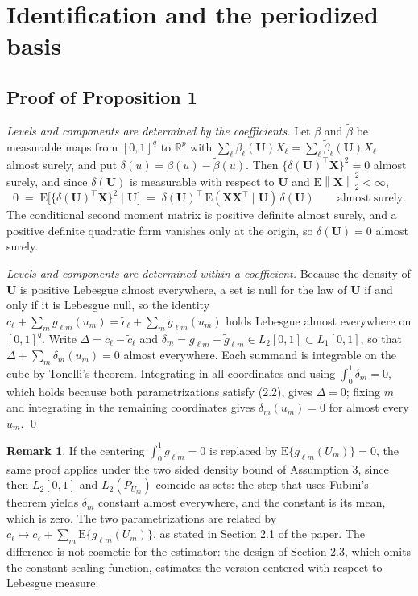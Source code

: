 \documentclass[10pt]{book}
\theoremstyle{definition}
\newtheorem{remark}{Remark}[section]
\newcommand{\R}{\mathbb{R}}
\newcommand{\E}{\mathrm{E}}
\newcommand{\T}{^{\top}}
\newcommand{\norm}[1]{\left\lVert #1 \right\rVert}
\newcommand{\cv}{\ell}
\newcommand{\md}{m}
\newcommand{\bX}{\mathbf{X}}
\newcommand{\bU}{\mathbf{U}}
\newcommand{\fcoef}[1]{\beta_{#1}}
\newcommand{\lvl}[1]{c_{#1}}
\newcommand{\gcomp}[2]{g_{#1#2}}
\begin{document}
\section{Identification and the periodized basis}
\setcounter{equation}{0}

\subsection*{Proof of Proposition 1}

\emph{Levels and components are determined by the coefficients.} Let $\beta$
and $\tilde\beta$ be measurable maps from $[0,1]^q$ to $\R^p$ with
$\sum_{\cv}\fcoef{\cv}(\bU)X_{\cv} = \sum_{\cv}\tilde\beta_{\cv}(\bU)X_{\cv}$
almost surely, and put $\delta(u) = \beta(u)-\tilde\beta(u)$. Then
$\{\delta(\bU)\T\bX\}^2 = 0$ almost surely, and since $\delta(\bU)$ is
measurable with respect to $\bU$ and $\E\norm{\bX}_2^2 < \infty$,
\[
  0 \;=\; \E\bigl[\{\delta(\bU)\T\bX\}^2 \mid \bU\bigr]
  \;=\; \delta(\bU)\T\,\E(\bX\bX\T\mid\bU)\,\delta(\bU)
  \qquad \text{almost surely.}
\]
The conditional second moment matrix is positive definite almost surely, and a
positive definite quadratic form vanishes only at the origin, so
$\delta(\bU) = 0$ almost surely.

\emph{Levels and components are determined within a coefficient.} Because the
density of $\bU$ is positive Lebesgue almost everywhere, a set is null for the
law of $\bU$ if and only if it is Lebesgue null, so the identity
$\lvl{\cv} + \sum_{\md}\gcomp{\cv}{\md}(u_{\md}) =
\tilde{c}_{\cv} + \sum_{\md}\tilde{g}_{\cv\md}(u_{\md})$ holds Lebesgue almost
everywhere on $[0,1]^q$. Write $\Delta = \lvl{\cv}-\tilde{c}_{\cv}$ and
$\delta_{\md} = \gcomp{\cv}{\md}-\tilde{g}_{\cv\md} \in L_2[0,1] \subset
L_1[0,1]$, so that $\Delta + \sum_{\md}\delta_{\md}(u_{\md}) = 0$ almost
everywhere. Each summand is integrable on the cube by Tonelli's theorem.
Integrating in all coordinates and using $\int_0^1\delta_{\md} = 0$, which
holds because both parametrizations satisfy (2.2), gives $\Delta = 0$; fixing
$\md$ and integrating in the remaining coordinates gives
$\delta_{\md}(u_{\md}) = 0$ for almost every $u_{\md}$. \qed

\begin{remark}
\label{rem:centering}
If the centering $\int_0^1 \gcomp{\cv}{\md} = 0$ is replaced by
$\E\{\gcomp{\cv}{\md}(U_{\md})\} = 0$, the same proof applies under the
two sided density bound of Assumption 3, since then $L_2[0,1]$ and
$L_2(P_{U_{\md}})$ coincide as sets: the step that uses Fubini's theorem
yields $\delta_{\md}$ constant almost everywhere, and the constant is its
mean, which is zero. The two parametrizations are related by
$\lvl{\cv} \mapsto \lvl{\cv} + \sum_{\md}\E\{\gcomp{\cv}{\md}(U_{\md})\}$, as
stated in Section 2.1 of the paper. The difference is not cosmetic for the
estimator: the design of Section 2.3, which omits the constant scaling
function, estimates the version centered with respect to Lebesgue measure.
\end{remark}
\end{document}
